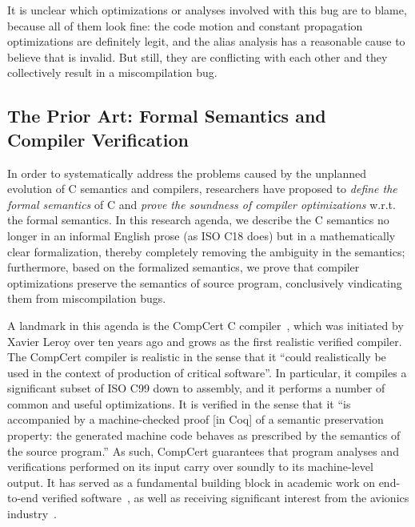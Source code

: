\noindent It is unclear which optimizations or analyses involved with this bug are to blame, because
all of them look fine: the code motion and constant propagation optimizations are definitely legit,
and the alias analysis has a reasonable cause to believe that  is invalid.  But still, they
are conflicting with each other and they collectively result in a miscompilation bug.


\subsection{The Prior Art: Formal Semantics and Compiler Verification}

In order to systematically address the problems caused by the unplanned evolution of C semantics and
compilers, researchers have proposed to \emph{define the formal semantics} of C and \emph{prove the
  soundness of compiler optimizations} w.r.t. the formal semantics.  In this research agenda, we
describe the C semantics no longer in an informal English prose (as ISO C18 does) but in a
mathematically clear formalization, thereby completely removing the ambiguity in the semantics;
furthermore, based on the formalized semantics, we prove that compiler optimizations preserve the
semantics of source program, conclusively vindicating them from miscompilation bugs.

A landmark in this agenda is the CompCert C compiler~\cite{compcert}, which was initiated by Xavier
Leroy over ten years ago and grows as the first realistic verified compiler.  The CompCert compiler
is realistic in the sense that it ``could realistically be used in the context of production of
critical software''.  In particular, it compiles a significant subset of ISO C99 down to assembly,
and it performs a number of common and useful optimizations.  It is verified in the sense that it
``is accompanied by a machine-checked proof [in Coq] of a semantic preservation property: the
generated machine code behaves as prescribed by the semantics of the source program.''  As such,
CompCert guarantees that program analyses and verifications performed on its input carry over
soundly to its machine-level output.  It has served as a fundamental building block in academic work
on end-to-end verified software~\cite{TODO}, as well as receiving significant interest from the
avionics industry~\cite{TODO}. 

